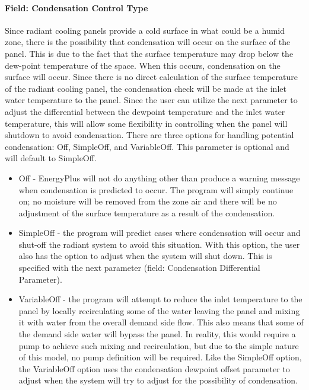 \paragraph{Field: Condensation Control Type}

Since radiant cooling panels provide a cold surface in what could be a humid zone, there is the possibility that condensation will occur on the surface of the panel. This is due to the fact that the surface temperature may drop below the dew-point temperature of the space. When this occurs, condensation on the surface will occur. Since there is no direct calculation of the surface temperature of the radiant cooling panel, the condensation check will be made at the inlet water temperature to the panel. Since the user can utilize the next parameter to adjust the differential between the dewpoint temperature and the inlet water temperature, this will allow some flexibility in controlling when the panel will shutdown to avoid condensation. There are three options for handling potential condensation: Off, SimpleOff, and VariableOff. This parameter is optional and will default to SimpleOff.

\begin{itemize}
\item
  Off - EnergyPlus will not do anything other than produce a warning message when condensation is predicted to occur. The program will simply continue on; no moisture will be removed from the zone air and there will be no adjustment of the surface temperature as a result of the condensation.
\item
  SimpleOff - the program will predict cases where condensation will occur and shut-off the radiant system to avoid this situation. With this option, the user also has the option to adjust when the system will shut down. This is specified with the next parameter (field: Condensation Differential Parameter).
\item
  VariableOff - the program will attempt to reduce the inlet temperature to the panel by locally recirculating some of the water leaving the panel and mixing it with water from the overall demand side flow.  This also means that some of the demand side water will bypass the panel. In reality, this would require a pump to achieve such mixing and recirculation, but due to the simple nature of this model, no pump definition will be required. Like the SimpleOff option, the VariableOff option uses the condensation dewpoint offset parameter to adjust when the system will try to adjust for the possibility of condensation.
\end{itemize}

